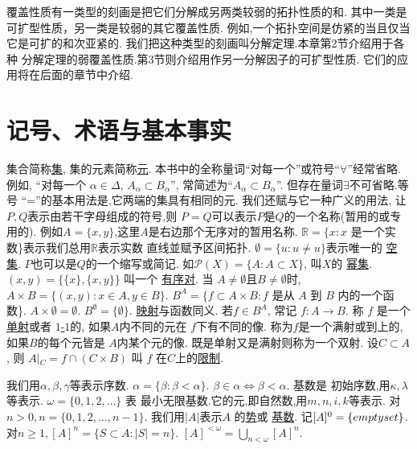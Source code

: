 \documentclass[main.tex]{subfiles}
\begin{document}
	
覆盖性质有一类型的刻画是把它们分解成另两类较弱的拓扑性质的和.
其中一类是可扩型性质，另一类是较弱的其它覆盖性质.
例如,一个拓扑空间是仿紧的当且仅当它是可扩的和次亚紧的.
我们把这种类型的刻画叫分解定理.本章第2节介绍用于各种
分解定理的弱覆盖性质.第3节则介绍用作另一分解因子的可扩型性质.
它们的应用将在后面的章节中介绍.
	
\section{记号、术语与基本事实}\label{sec:1.1}

集合简称\underline{集},
集的元素简称\underline{元}.
本书中的全称量词``对每一个''或符号``$\forall$”经常省略.例如, “对每一个
$\alpha\in\Delta$, $A_\alpha \subset B_\alpha$”,
常简述为“$A_\alpha \subset B_\alpha$”.
但存在量词$\exists$不可省略.等号
“=”的基本用法是,它两端的集具有相同的元.
我们还赋与它一种广义的用法, 让$P, Q$表示由若干字母组成的符号,则
$P=Q$可以表示$P$是$Q$的一个名称(暂用的或专用的).
例如$A=\{x,y\}$,这里$A$是右边那个无序对的暂用名称.
$\mathbb{R} = \{x: x$ 是一个实数\}表示我们总用$\mathbb{R}$表示实数
直线並赋予区间拓扑.
$\emptyset=\{u: u\ne u\}$表示唯一的
\underline{空集}.
$P$也可以是$Q$的一个缩写或简记. 如$\mathscr{P}(X)=\{A:A\subset X\}$, 叫$X$的
\underline{幂集}.
$(x, y) = \{ \{x\}, \{x, y\}\}$ 叫一个
\underline{有序对}. 
当 $A\ne \emptyset$且$B\ne \emptyset$时, $A\times B = \{(x, y): x\in A, y\in B\}$.
$B^A = \{f\subset A\times B: f$ 是从 $A$ 到 $B$ 内的一个函数\}.
$A\times \emptyset = \emptyset$. $B^\emptyset = \{\emptyset\}$.
\underline{映射}与函数同义.  
若$f\in B^A$, 常记 $f: A\to B$. 称 $f$ 是一个
\underline{单射}或者
\underline{$1$-$1$}的,
如果$A$内不同的元在  $f$下有不同的像.
称为$f$是一个满射或到上的,如果$B$的每个元皆是
$A$内某个元的像. 既是单射又是满射则称为一个双射.
设$C\subset A$, 则 $A\vert{}_C = f\cap (C\times B)$ 叫 $f$
在$C$上的\underline{限制}.

我们用$\alpha, \beta, \gamma$等表示序数. $\alpha = \{\beta: \beta < \alpha\}$. $\beta \in \alpha \Leftrightarrow\beta<\alpha$. 基数是
初始序数,用$\kappa,\lambda$ 等表示. $\omega = \{0, 1, 2, \dots\}$ 表
最小无限基数.它的元,即自然数,用$m, n, i , k$等表示.
对$n>0, n = \{0,1,2, \dots, n-1\}$. 我们用$|A|$表示$A$ 
的\underline{势}或
\underline{基数}.
记$[A]^0=\{\\emptyset\}$. 对$n\ge1, [A]^n = \{S\subset A: |S| = n\}$.
$[A]^{<\omega} = \bigcup_{n<\omega}[A]^n$.
\end{document}
